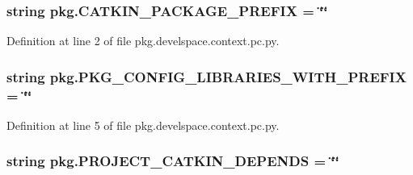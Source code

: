 \subsubsection[{\texorpdfstring{C\+A\+T\+K\+I\+N\+\_\+\+P\+A\+C\+K\+A\+G\+E\+\_\+\+P\+R\+E\+F\+IX}{CATKIN_PACKAGE_PREFIX}}]{\setlength{\rightskip}{0pt plus 5cm}string pkg.\+C\+A\+T\+K\+I\+N\+\_\+\+P\+A\+C\+K\+A\+G\+E\+\_\+\+P\+R\+E\+F\+IX = \char`\"{}\char`\"{}}\hypertarget{namespacepkg_ae26c7a5a06b7d738f4d210ca449e6bee}{}\label{namespacepkg_ae26c7a5a06b7d738f4d210ca449e6bee}


Definition at line 2 of file pkg.\+develspace.\+context.\+pc.\+py.

\subsubsection[{\texorpdfstring{P\+K\+G\+\_\+\+C\+O\+N\+F\+I\+G\+\_\+\+L\+I\+B\+R\+A\+R\+I\+E\+S\+\_\+\+W\+I\+T\+H\+\_\+\+P\+R\+E\+F\+IX}{PKG_CONFIG_LIBRARIES_WITH_PREFIX}}]{\setlength{\rightskip}{0pt plus 5cm}string pkg.\+P\+K\+G\+\_\+\+C\+O\+N\+F\+I\+G\+\_\+\+L\+I\+B\+R\+A\+R\+I\+E\+S\+\_\+\+W\+I\+T\+H\+\_\+\+P\+R\+E\+F\+IX = \char`\"{}\char`\"{}}\hypertarget{namespacepkg_a433e30cecb4a0123a7c4b384d168e336}{}\label{namespacepkg_a433e30cecb4a0123a7c4b384d168e336}


Definition at line 5 of file pkg.\+develspace.\+context.\+pc.\+py.

\subsubsection[{\texorpdfstring{P\+R\+O\+J\+E\+C\+T\+\_\+\+C\+A\+T\+K\+I\+N\+\_\+\+D\+E\+P\+E\+N\+DS}{PROJECT_CATKIN_DEPENDS}}]{\setlength{\rightskip}{0pt plus 5cm}string pkg.\+P\+R\+O\+J\+E\+C\+T\+\_\+\+C\+A\+T\+K\+I\+N\+\_\+\+D\+E\+P\+E\+N\+DS = \char`\"{}\char`\"{}}\hypertarget{namespacepkg_a17c18447fad253ee1c0d76deec88028c}{}\label{namespacepkg_a17c18447fad253ee1c0d76deec88028c}


